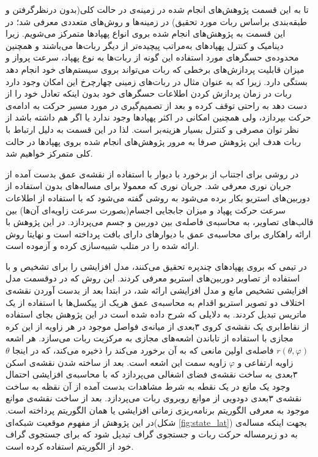 تا به این قسمت پژوهش‌های انجام شده در زمینه‌ی  در حالت کلی(بدون درنظرگرفتن و طبقه‌بندی براساس ربات مورد تحقیق) در زمینه‌ها و روش‌های متعددی معرفی شد؛ در این قسمت به پژوهش‌های انجام شده بروی انواع پهپادها متمرکز می‌شویم. زیرا دینامیک و کنترل پهپادهای به‌مراتب پیچیده‌تر از دیگر ربات‌ها می‌باشند و همچنین محدوده‌ی حسگرهای مورد استفاده این گونه از ربات‌ها به نوع پهپاد، سرعت پرواز و میزان قابلیت پردازش‌های برخطی که ربات می‌تواند بروی سیستم‌های خود انجام دهد بستگی دارد. زیرا که به عنوان مثال در ربات‌های زمینی چهارچرخ این امکان وجود دارد ربات در زمان پردازش کردن اطلاعات حسگرهای خود بدون اینکه تعادل خود را از دست دهد به راحتی توقف کرده و بعد از تصمیم‌گیری در مورد مسیر حرکت به ادامه‌ی حرکت بپردازد، ولی همچنین امکانی در اکثر پهپادها وجود ندارد یا اگر هم داشته باشد از نظر توان مصرفی و کنترل بسیار هزینه‌بر است. لذا در این قسمت به دلیل ارتباط با ربات هدف این پژوهش صرفا به مرور پژوهش‌های انجام شده بروی پهپادها در حالت کلی متمرکز خواهیم شد.

در  روشی برای اجتناب از برخورد با دیوار با استفاده از نقشه‌ی عمق بدست آمده از جریان نوری معرفی شد. جریان نوری که معمولا برای مساله‌های  بدون استفاده از دوربین‌های استریو بکار برده می‌شود به روشی گفته می‌شود که با استفاده از اطلاعات سرعت حرکت پهپاد و میزان جابجایی اجسام(بصورت سرعت زاویه‌ای آن‌ها) بین قالب‌های تصاویر، به محاسبه‌ی فاصله‌ی بین دوربین و جسم می‌پردازد. در این پژوهش با ارائه راهکاری برای محاسبه‌ی عمق با دیوارهای دارای بافت پرداخته است و نهایتا روش ارائه شده را در متلب شبیه‌سازی کرده و آزموده است.

در  تیمی که بروی پهپادهای چندپره تحقیق می‌کنند، مدل افزایشی را برای تشخیص و  با استفاده از تصاویر دوربین‌های استریو معرفی کردند. این روش که در دوقسمت مدل افزایشی تشخیص مانع و مدل افزایشی  ارائه شد، در ابتدا بعد از بدست آوردن نقشه‌ی اختلاف دو تصویر استریو اقدام به محاسبه‌ی عمق هریک از پیکسل‌ها با استفاده از یک ماتریس تبدیل کردند. به دلایلی که شرح داده شده است در این پژوهش بجای استفاده از نقاط‌ابری یک نقشه‌ی کروی ۳بعدی از میانه‌ی فواصل موجود در هر زاویه‌ از این کره مجازی با استفاده از تاباندن اشعه‌های مجازی به مرکزیت ربات می‌سازد. هر اشعه $r(\theta, \varphi)$ فاصله‌ی اولین مانعی که به آن برخورد می‌کند را ذخیره می‌کند، که در اینجا $\theta$ زاویه ارتفاعی و $\varphi$ زاویه سمت این اشعه است. بعد از ساخته شدن نقشه‌ی اسکن ۳بعدی به ساخت نقشه‌ی فضای اشغالی می‌پردازد که با محاسبه‌ی افزایشی احتمال وجود یک مانع در یک نقطه به شرط مشاهدات بدست آمده از آن نقظه به ساخت نقشه‌ی ۳بعدی دودویی از موانع روبروی ربات می‌پردازد. بعد از ساخت نقشه‌ی موانع موجود به معرفی الگوریتم برنامه‌ریزی زمانی افزایشی یا همان الگوریتم  پرداخته است. در این پژوهش از مفهوم موقعیت شبکه‌ای(شکل \ref{fig:state_lat}) بجهت اینکه مساله‌ی  به دو زیرمساله حرکت ربات و جستجوی گراف تبدیل شود که برای جستجوی گراف خود از الگوریتم  استفاده کرده است.


